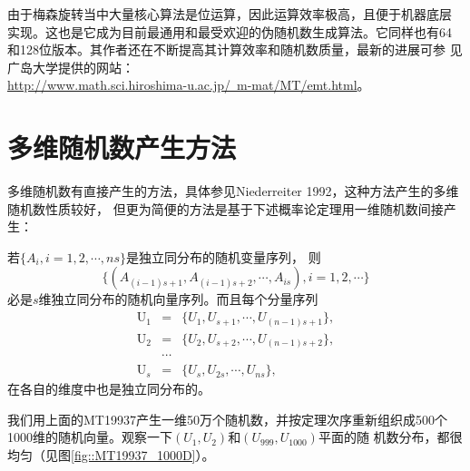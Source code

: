 由于梅森旋转当中大量核心算法是位运算，因此运算效率极高，且便于机器底层
实现。这也是它成为目前最通用和最受欢迎的伪随机数生成算法。它同样也有64
和128位版本。其作者还在不断提高其计算效率和随机数质量，最新的进展可参
见广岛大学提供的网站：\\
\href{http://www.math.sci.hiroshima-u.ac.jp/~m-mat/MT/emt.html}
     {http://www.math.sci.hiroshima-u.ac.jp/~m-mat/MT/emt.html}。

\section{多维随机数产生方法}
多维随机数有直接产生的方法，具体参见Niederreiter
1992\cite{Niederreiter1992Random}，这种方法产生的多维随机数性质较好，
但更为简便的方法是基于下述概率论定理用一维随机数间接产生：

\begin{theorem}
  若$\{A_i, i = 1, 2, \cdots, ns\}$是独立同分布的随机变量序列，
  则
  \begin{equation}
    \{(A_{(i - 1)s + 1}, A_{(i - 1)s + 2}, \cdots, A_{is}), i = 1, 2, \cdots\}
    \label{thm::mulvar}
  \end{equation}
  必是$s$维独立同分布的随机向量序列。而且每个分量序列
  \begin{equation}
    \begin{array}{rcl}
      \mathrm{U}_1 &=& \{U_1, U_{s + 1}, \cdots, U_{(n - 1)s + 1}\},\\
      \mathrm{U}_2 &=& \{U_2, U_{s + 2}, \cdots, U_{(n - 1)s + 2}\},\\
      &\cdots&\\
      \mathrm{U}_s &=& \{U_s, U_{2s}, \cdots, U_{ns}\},
    \end{array}
  \end{equation}
  在各自的维度中也是独立同分布的。
\end{theorem}

我们用上面的MT19937产生一维50万个随机数，并按定理次序重新组织成500个
1000维的随机向量。观察一下$(U_1, U_2)$和$(U_{999}, U_{1000})$平面的随
机数分布，都很均匀（见图\ref{fig::MT19937_1000D}）。

